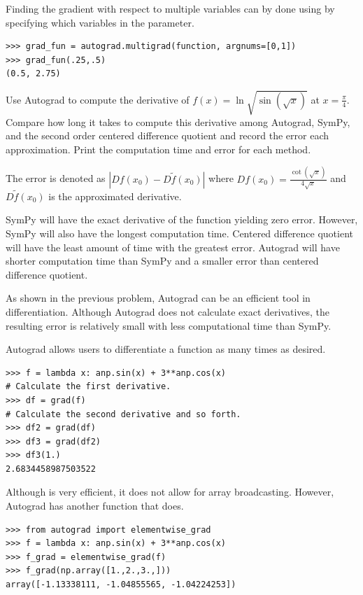 Finding the gradient with respect to multiple variables can by done using  by specifying which variables in the  parameter.

\begin{lstlisting}
>>> grad_fun = autograd.multigrad(function, argnums=[0,1])
>>> grad_fun(.25,.5)
(0.5, 2.75)
\end{lstlisting}

\begin{problem}
Use Autograd to compute the derivative of $f(x) = \ln \sqrt{ \sin \left(\sqrt {x}\right) }$ at $x=\frac{\pi}{4}$.
Compare how long it takes to compute this derivative among Autograd, SymPy, and the second order centered difference quotient and record the error each approximation.
Print the computation time and error for each method.

The error is denoted as  $|Df(x_0) - D\tilde{f}(x_0)|$ where $Df(x_0) = \frac{\cot\left(\sqrt{x}\right)}{4\sqrt{x}} $
 and $D\tilde{f}(x_0)$ is the approximated derivative.

SymPy will have the exact derivative of the function yielding zero error. However, SymPy will also have the longest computation time. Centered difference quotient will have the least amount of time with the greatest error.
Autograd will have shorter computation time than SymPy and a smaller error than centered difference quotient.
\end{problem}

As shown in the previous problem, Autograd can be an efficient tool in differentiation.
Although Autograd does not calculate exact derivatives, the resulting error is relatively small with less computational time than SymPy.

Autograd allows users to differentiate a function as many times as desired.

\begin{lstlisting}
>>> f = lambda x: anp.sin(x) + 3**anp.cos(x)
# Calculate the first derivative.
>>> df = grad(f)
# Calculate the second derivative and so forth.
>>> df2 = grad(df)
>>> df3 = grad(df2)
>>> df3(1.)
2.6834458987503522
\end{lstlisting}

Although  is very efficient, it does not allow for array broadcasting.
However, Autograd has another function  that does.

\begin{lstlisting}
>>> from autograd import elementwise_grad
>>> f = lambda x: anp.sin(x) + 3**anp.cos(x)
>>> f_grad = elementwise_grad(f)
>>> f_grad(np.array([1.,2.,3.,]))
array([-1.13338111, -1.04855565, -1.04224253])
\end{lstlisting}

